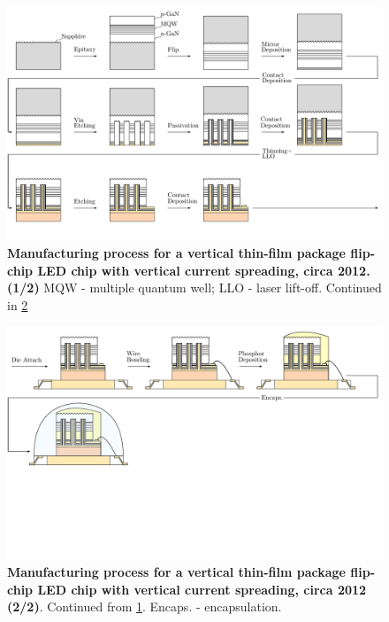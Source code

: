 \documentclass[parskip=full]{article}
\begin{document}

    \begin{landscape}
        \begin{figure}
            \includegraphics[width=595pt]{./figures/vtf_overview_2012-1.pdf}
            \caption{\textbf{Manufacturing process for a vertical thin-film  package flip-chip LED chip with vertical current spreading, circa 2012. (1/2)} MQW - multiple quantum well; LLO - laser lift-off. Continued in \cref{fig:manuf_vtf_2012-2}}
            \label{fig:manuf_vtf_2012-1}
        \end{figure}
    \end{landscape}

    \begin{landscape}
        \begin{figure}
            \includegraphics[width=595pt]{./figures/vtf_overview_2012-2.pdf}
            \caption{\textbf{Manufacturing process for a vertical thin-film package flip-chip LED chip with vertical current spreading, circa 2012 (2/2)}. Continued from \cref{fig:manuf_vtf_2012-1}. Encaps. - encapsulation.}
            \label{fig:manuf_vtf_2012-2}
        \end{figure}
    \end{landscape}
\end{document}
